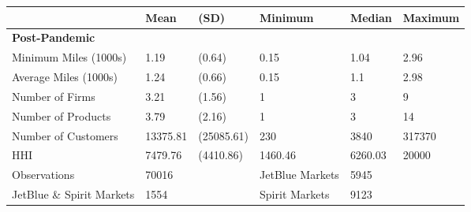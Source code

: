
\begin{tabular}[t]{llllll}
\toprule
 & Mean & (SD) & Minimum & Median & Maximum\\
\midrule
\multicolumn{6}{l}{\textbf{Post-Pandemic}}\\
\hspace{1em}Minimum Miles (1000s) & 1.19 & (0.64) & 0.15 & 1.04 & 2.96\\
\hspace{1em}Average Miles (1000s) & 1.24 & (0.66) & 0.15 & 1.1 & 2.98\\
\hspace{1em}Number of Firms & 3.21 & (1.56) & 1 & 3 & 9\\
\hspace{1em}Number of Products & 3.79 & (2.16) & 1 & 3 & 14\\
\hspace{1em}Number of Customers & 13375.81 & (25085.61) & 230 & 3840 & 317370\\
\hspace{1em}HHI & 7479.76 & (4410.86) & 1460.46 & 6260.03 & 20000\\
\midrule
\hspace{1em}Observations & 70016 &  & JetBlue Markets & 5945 & \\
\hspace{1em}JetBlue \& Spirit Markets & 1554 &  & Spirit Markets & 9123 & \\
\bottomrule
\end{tabular}
